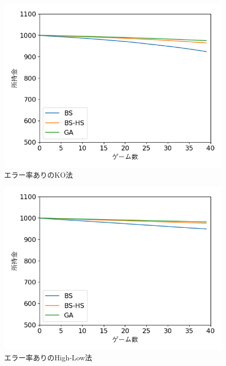 \begin{figure}[H]
 \begin{center} 
  \includegraphics[width=0.7\linewidth]{./figure/betsimulation-errKO}
  \caption{エラー率ありのKO法\label{errKO}}
 \end{center}
\end{figure}

\begin{figure}[H]
 \begin{center} 
  \includegraphics[width=0.7\linewidth]{./figure/betsimulation-errHi-Lo}
  \caption{エラー率ありのHigh-Low法\label{errHi-Lo}}
 \end{center}
\end{figure}

